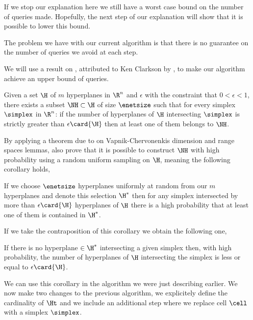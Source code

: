 
If we stop our explanation here we still have a worst case 
bound on the number of queries made. Hopefully, the next step of our
explanation will show that it is possible to lower this bound.

The problem we have with our current algorithm is that there is no guarantee
on the number of queries we avoid at each step.

We will use a result on \enets, attributed to Ken Clarkson by
\citet{burgisser:1997}, to make our algorithm achieve an upper bound
of  queries.

\begin{theorem}[Clarkson]
Given a set $\H$ of $m$ hyperplanes in $\R^n$ and $\epsilon$ with the
constraint that $0 < \epsilon < 1$, there exists a subset $\NH \subset \H$ of
size $\enetsize$ such that for every simplex $\simplex$ in $\R^n$: if the
number of hyperplanes of $\H$ intersecting $\simplex$ is strictly greater than
$\epsilon \card{\H}$ then at least one of them belongs to $\NH$.
\end{theorem}

By applying a theorem due to \citet*{haussler:1987} on Vapnik-Chervonenkis
dimension and range spaces lemmas, \citet{burgisser:1997} also prove that it is possible to
construct $\NH$ with high probability using a random uniform sampling on $\H$,
meaning the following corollary holds,

\begin{corollary}
If we choose $\enetsize$ hyperplanes uniformly at
random from our $m$ hyperplanes and denote this selection $\H^{*}$ then for
any simplex intersected by more than $\epsilon \card{\H}$ hyperplanes of $\H$
there is a high probability that at least one of them is contained in $\H^{*}$.
\end{corollary}

If we take the contraposition of this corollary we obtain the following one,

\begin{corollary}
If there is no hyperplane $\in \H^{*}$ intersecting a given simplex then, with
high probability, the number of hyperplanes of $\H$ intersecting the simplex
is less or equal to $\epsilon \card{\H}$.
\end{corollary}

We can use this corollary in the algorithm we were just describing earlier. We
now make two changes to the previous algorithm, we explicitely define the
cardinality of $\Ht$ and we include an additional step where we replace cell
$\cell$ with a simplex $\simplex$.

